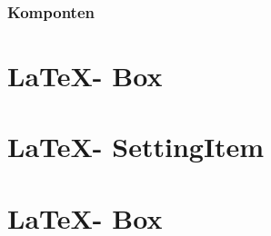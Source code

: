 \subsubsection{Komponten}
\section{\LaTeX - Box} %
\section{\LaTeX - SettingItem} %
\section{\LaTeX - Box} %